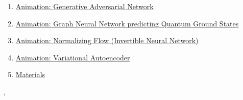 \documentclass[11pt]{article}
\renewcommand{\today}{\shortmonthname[\the\month] \the \day,  \the\year}
\begin{document}
\begin{enumerate}
	\item \href{https://mp.weixin.qq.com/s/x7Ll4Jz3mXs14K1qYtcGxg}{Animation: Generative Adversarial Network}%
	\item \href{https://mp.weixin.qq.com/s/EeytQR4GIti8wApsEFEnaw}{Animation: Graph Neural Network predicting Quantum Ground States}%
	\item \href{https://mp.weixin.qq.com/s/OVYGO7-Kfq0ogsHxEPItpw}{Animation: Normalizing Flow (Invertible Neural Network)}%
	\item \href{https://mp.weixin.qq.com/s/9mDR44X6quFyEXVedwbaSQ}{Animation: Variational Autoencoder}%
	\item \href{url}{Materials}
\end{enumerate}


%
\begin{flushright}
	\tiny \today 
\end{flushright}
\end{document}

